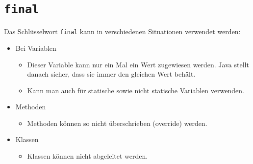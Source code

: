 \documentclass{article}
\begin{document}
	\section{\texorpdfstring{\texttt{final}}{final}}
	Das Schlüsselwort \verb|final| kann in verschiedenen Situationen verwendet werden:
	\begin{itemize}
	 	\item{Bei Variablen}
	 	\begin{itemize}
	 		\item{Dieser Variable kann nur ein Mal ein Wert zugewiesen werden. Java stellt danach sicher, dass sie immer den gleichen Wert behält.}
	 		\item{Kann man auch für statische sowie nicht statische Variablen verwenden.}
	 	\end{itemize}
	 	\item{Methoden}
	 	\begin{itemize}
	 		\item{Methoden können so nicht überschrieben (override) werden.}
	 	\end{itemize}
	 	\item{Klassen}
	 	\begin{itemize}
	 		\item{Klassen können nicht abgeleitet werden.}
	 	\end{itemize}
	 \end{itemize} 
\end{document}
